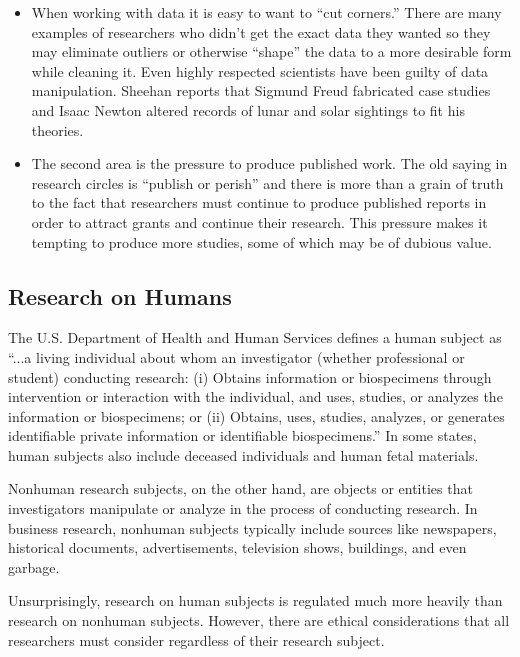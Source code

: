 \begin{itemize}
	\item When working with data it is easy to want to ``cut corners.'' There are many examples of researchers who didn't get the exact data they wanted so they may eliminate outliers or otherwise ``shape'' the data to a more desirable form while cleaning it. Even highly respected scientists have been guilty of data manipulation. Sheehan reports that Sigmund Freud fabricated case studies and Isaac Newton altered records of lunar and solar sightings to fit his theories\cite{sheehan2007fraud}.

	\item The second area is the pressure to produce published work. The old saying in research circles is ``publish or perish'' and there is more than a grain of truth to the fact that researchers must continue to produce published reports in order to attract grants and continue their research. This pressure makes it tempting to produce more studies, some of which may be of dubious value.

\end{itemize}

\subsection{Research on Humans}

The U.S. Department of Health and Human Services defines a human subject as ``...a living individual about whom an investigator (whether professional or student) conducting research: (i) Obtains information or biospecimens through intervention or interaction with the individual, and uses, studies, or analyzes the information or biospecimens; or (ii) Obtains, uses, studies, analyzes, or generates identifiable private information or identifiable biospecimens.''\cite{hhs2018human} In some states, human subjects also include deceased individuals and human fetal materials. 

Nonhuman research subjects, on the other hand, are objects or entities that investigators manipulate or analyze in the process of conducting research. In business research, nonhuman subjects typically include sources like newspapers, historical documents, advertisements, television shows, buildings, and even garbage.

Unsurprisingly, research on human subjects is regulated much more heavily than research on nonhuman subjects. However, there are ethical considerations that all researchers must consider regardless of their research subject.

